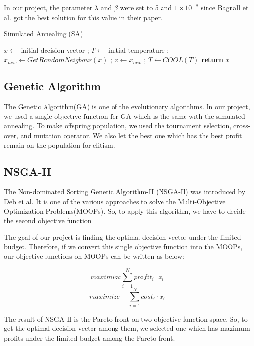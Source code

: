 In our project, the parameter $\lambda$ and $\beta$ were set to 5 and $1 \times 10^{-8}$ since Bagnall et al. got the best solution for this value in their paper.


\begin{algorithm}
\caption{Simulated Annealing (SA)}\label{alg:SA}
\begin{algorithmic}
    \State $x \gets$ initial decision vector ;
    \State $T \gets$ initial temperature ; 
        \State $x_{new} \gets GetRandomNeigbour(x)$ ;
            \State $x \gets x_{new}$ ;
        \EndIf
        \State $T \gets COOL(T)$ 
    \EndWhile
    \textbf{return} $x$
\end{algorithmic}
\end{algorithm}

\subsection{Genetic Algorithm}
The Genetic Algorithm(GA) is one of the evolutionary algorithms. In our project, we used a single objective function for GA which is the same with the simulated annealing. To make offspring population, we used the tournament selection, cross-over, and mutation operator. We also let the best one which has the best profit remain on the population for elitism.

\subsection{NSGA-II}
The Non-dominated Sorting Genetic Algorithm-II (NSGA-II) was introduced by Deb et al.\cite{NSGA2} It is one of the various approaches to solve the Multi-Objective Optimization Problems(MOOPs). So, to apply this algorithm, we have to decide the second objective function. 

The goal of our project is finding the optimal decision vector under the limited budget. Therefore, if we convert this single objective function into the MOOPs, our objective functions on MOOPs can be written as below:

\[
maximize \sum_{i = 1}^{N} profit_i \cdot x_i
\]
\[
maximize -\sum_{i = 1}^{N} cost_i \cdot x_i
\]

The result of NSGA-II is the Pareto front on two objective function space. So, to get the optimal decision vector among them, we selected one which has maximum profits under the limited budget among the Pareto front.


